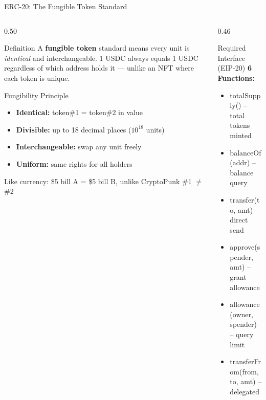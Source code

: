 \documentclass[8pt,aspectratio=169]{beamer}
\begin{document}
\begin{frame}{ERC-20: The Fungible Token Standard}
  \begin{columns}[T]
    \begin{column}{0.50\textwidth}
      \begin{block}{Definition}
        \small
        A \textbf{fungible token} standard means every unit is \emph{identical}
        and interchangeable. 1 USDC always equals 1 USDC regardless of which
        address holds it --- unlike an NFT where each token is unique.
      \end{block}
      \vspace{4pt}
      \begin{block}{Fungibility Principle}
        \small
        \begin{itemize}\setlength\itemsep{2pt}
          \item \textbf{Identical:} token\#1 = token\#2 in value
          \item \textbf{Divisible:} up to 18 decimal places ($10^{18}$ units)
          \item \textbf{Interchangeable:} swap any unit freely
          \item \textbf{Uniform:} same rights for all holders
        \end{itemize}
        \vspace{3pt}
        Like currency: \$5 bill A = \$5 bill B, unlike CryptoPunk \#1 $\neq$ \#2
      \end{block}
    \end{column}
    \begin{column}{0.46\textwidth}
      \begin{block}{Required Interface (EIP-20)}
        \textbf{6 Functions:}
        \begin{itemize}\setlength\itemsep{1pt}
          \item {\small\ttfamily totalSupply()} \textcolor{mlgray}{-- total tokens minted}
          \item {\small\ttfamily balanceOf(addr)} \textcolor{mlgray}{-- balance query}
          \item {\small\ttfamily transfer(to, amt)} \textcolor{mlgray}{-- direct send}
          \item {\small\ttfamily approve(spender, amt)} \textcolor{mlgray}{-- grant allowance}
          \item {\small\ttfamily allowance(owner, spender)} \textcolor{mlgray}{-- query limit}
          \item {\small\ttfamily transferFrom(from, to, amt)} \textcolor{mlgray}{-- delegated}

\end{itemize}
\end{block}
\end{column}
\end{columns}
\end{frame}
\end{document}
